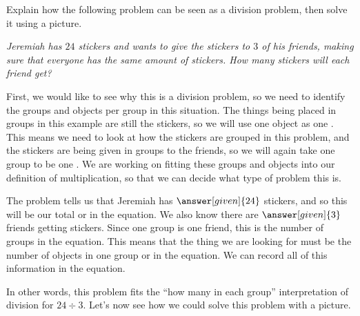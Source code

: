 \documentclass{ximera}
\begin{document}
\begin{example}
Explain how the following problem can be seen as a division problem, then solve it using a picture. 

\emph{Jeremiah has $24$ stickers and wants to give the stickers to $3$ of his friends, making sure that everyone has the same amount of stickers. How many stickers will each friend get?}

First, we would like to see why this is a division problem, so we need to identify the groups and objects per group in this situation. The things being placed in groups in this example are still the stickers, so we will use one object as one . This means we need to look at how the stickers are grouped in this problem, and the stickers are being given in groups to the friends, so we will again take one group to be one . We are working on fitting these groups and objects into our definition of multiplication, so that we can decide what type of problem this is.

The problem tells us that Jeremiah has $\answer[given]{24}$ stickers, and so this will be our total or  in the equation. We also know there are $\answer[given]{3}$ friends getting stickers. Since one group is one friend, this is the number of groups  in the equation. This means that the thing we are looking for must be the number of objects in one group or  in the equation. We can record all of this information in the equation.
\begin{image}
\end{image}

In other words, this problem fits the ``how many in each group'' interpretation of division for $24 \div 3$. Let's now see how we could solve this problem with a picture.


\end{example}
\end{document}
